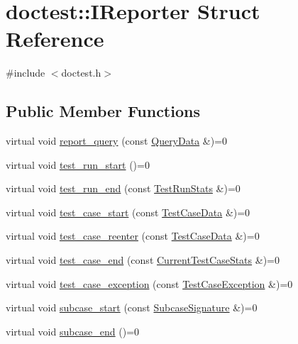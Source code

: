 \hypertarget{structdoctest_1_1IReporter}{}\section{doctest\+:\+:I\+Reporter Struct Reference}
\label{structdoctest_1_1IReporter}


{\ttfamily \#include $<$doctest.\+h$>$}

\subsection*{Public Member Functions}
\begin{DoxyCompactItemize}
\item 
virtual void \hyperlink{structdoctest_1_1IReporter_ae7e30d1c2cd332094c66d39bf3a85e52}{report\+\_\+query} (const \hyperlink{structdoctest_1_1QueryData}{Query\+Data} \&)=0
\item 
virtual void \hyperlink{structdoctest_1_1IReporter_a7f4a4b654726d4b266c91cc0e1569f96}{test\+\_\+run\+\_\+start} ()=0
\item 
virtual void \hyperlink{structdoctest_1_1IReporter_a610495b7caa29e36b5ea62bff62952ed}{test\+\_\+run\+\_\+end} (const \hyperlink{structdoctest_1_1TestRunStats}{Test\+Run\+Stats} \&)=0
\item 
virtual void \hyperlink{structdoctest_1_1IReporter_afa107df2d0230607e2f86f1876f48526}{test\+\_\+case\+\_\+start} (const \hyperlink{structdoctest_1_1TestCaseData}{Test\+Case\+Data} \&)=0
\item 
virtual void \hyperlink{structdoctest_1_1IReporter_a46c2fe41e5fa3d6930a3cb26d81ed764}{test\+\_\+case\+\_\+reenter} (const \hyperlink{structdoctest_1_1TestCaseData}{Test\+Case\+Data} \&)=0
\item 
virtual void \hyperlink{structdoctest_1_1IReporter_a43f8f19681dd5d42218ecb4fd935cda7}{test\+\_\+case\+\_\+end} (const \hyperlink{structdoctest_1_1CurrentTestCaseStats}{Current\+Test\+Case\+Stats} \&)=0
\item 
virtual void \hyperlink{structdoctest_1_1IReporter_a40b0cdf1ad59dabc736e35fde63d516f}{test\+\_\+case\+\_\+exception} (const \hyperlink{structdoctest_1_1TestCaseException}{Test\+Case\+Exception} \&)=0
\item 
virtual void \hyperlink{structdoctest_1_1IReporter_a03ef82d6fb9afe8b0e3bbe24f28dd268}{subcase\+\_\+start} (const \hyperlink{structdoctest_1_1SubcaseSignature}{Subcase\+Signature} \&)=0
\item 
virtual void \hyperlink{structdoctest_1_1IReporter_a05196dd1a5f7e40e8c734cd2a37d4e1e}{subcase\+\_\+end} ()=0

\end{DoxyCompactItemize}
